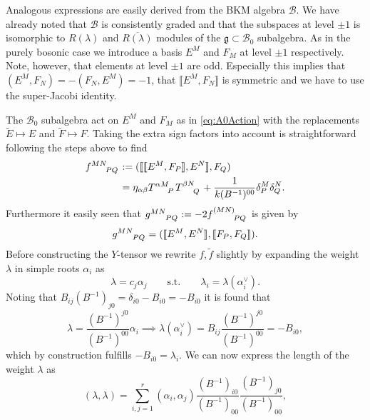 Analogous expressions are easily derived from the BKM algebra $\mathscr{B}$. We have already noted that $\mathscr{B}$ is consistently graded and that the subspaces at level $\pm 1$ is isomorphic to $R(\lambda)$ and $\overbar{R(\lambda)}$ modules of the $\mathfrak{g}\subset\mathscr{B}_0$ subalgebra. As in the purely bosonic case we introduce a basis $E^M$ and $F_M$ at level $\pm 1$ respectively. Note, however, that elements at level $\pm 1$ are odd. Especially this implies that $(E^M,F_N)=-(F_N,E^M)=-1$, that $\llbracket E^M,F_N\rrbracket$ is symmetric and we have to use the super-Jacobi identity. 

The $\mathscr{B}_0$ subalgebra act on $E^M$ and $F_M$ as in \eqref{eq:A0Action} with the replacements $\tilde{E}\mapsto E$ and $\tilde{F}\mapsto F$. Taking the extra sign factors into account is straightforward following the steps above to find 
\begin{equation}
    \begin{aligned}
        \tensor{f}{^{MN}_{PQ}} &:= (\llbracket\llbracket E^M,F_P\rrbracket,E^N\rrbracket,F_Q)\\
                                &= \eta_{\alpha\beta}\tensor{T}{^{\alpha M}_P}\tensor{T}{^{\beta N}_Q}+\frac{1}{k(B^{-1})^{00}}\delta^M_P\delta^N_Q.
    \end{aligned}
\end{equation}
Furthermore it easily seen that $\tensor{g}{^{MN}_{PQ}}:=-2\tensor{f}{^{(MN)}_{PQ}}$ is given by
\begin{equation}
    \tensor{g}{^{MN}_{PQ}} = (\llbracket E^M,E^N\rrbracket,\llbracket F_P,F_Q\rrbracket). 
\end{equation}
Before constructing the $Y$-tensor we rewrite $f,\tilde{f}$ slightly by expanding the weight $\lambda$ in simple roots $\alpha_i$ as 
\begin{equation}
    \lambda = c_j\alpha_j\qquad \text{s.t.}\qquad \lambda_i = \lambda(\alpha_i^\vee).
\end{equation}
Noting that $B_{ij}(B^{-1})_{j0}=\delta_{i0}-B_{i0}=-B_{i0}$ it is found that 
\begin{equation}
    \lambda = \frac{(B^{-1})^{j0}}{(B^{-1})^{00}}\alpha_i \implies \lambda(\alpha_i^\vee) = B_{ij}\frac{(B^{-1})^{j0}}{(B^{-1})^{00}} = -B_{i0},
\end{equation}
which by construction fulfills $-B_{i0}=\lambda_i$. We can now express the length of the weight $\lambda$ as 
\begin{equation}
    (\lambda,\lambda) = \sum_{i,j=1}^r (\alpha_i,\alpha_j)\frac{(B^{-1})_{i0}}{(B^{-1})_{00}}\frac{(B^{-1})_{j0}}{(B^{-1})_{00}},
\end{equation}
